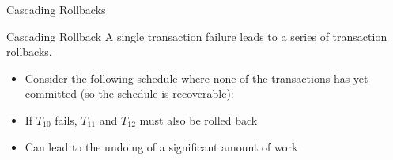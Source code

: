 \documentclass[aspectratio=169, xcolor=dvipsnames]{beamer}
\begin{document}
\begin{frame}{Cascading Rollbacks}
    \begin{block}{Cascading Rollback}
        A single transaction failure leads to a series of transaction rollbacks.
    \end{block}
    \begin{itemize}[<+->]
        \item Consider the following schedule where none of the transactions has yet committed (so the schedule is recoverable):
    \end{itemize}
    \begin{itemize}[<+->]
        \item If $T_{10}$ fails, $T_{11}$ and $T_{12}$ must also be rolled back
        \item Can lead to the undoing of a significant amount of work
    \end{itemize}
\end{frame}
\end{document}
